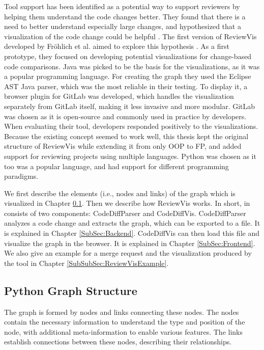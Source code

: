 \documentclass[a4paper,11pt,twoside]{article}
\theoremstyle{definition} %
\renewcommand{\cite}[1]{\citep{#1}}
\begin{document}
Tool support has been identified as a potential way to support reviewers by helping them understand the code changes better. They found that there is a need to better understand especially large changes, and hypothesized that a visualization of the code change could be helpful \cite{baum2016need}. The first version of ReviewVis developed by Fröhlich et al. aimed to explore this hypothesis \cite{publication-20661}. As a first prototype, they focused on developing potential visualizations for change-based code comparisons. Java was picked to be the basis for the visualizations, as it was a popular programming language. For creating the graph they used the Eclipse AST Java parser, which was the most reliable in their testing. To display it, a browser plugin for GitLab was developed, which handles the visualization separately from GitLab itself, making it less invasive and more modular. GitLab was chosen as it is open-source and commonly used in practice by developers. When evaluating their tool, developers responded positively to the visualizations. Because the existing concept seemed to work well, this thesis kept the original structure of ReviewVis while extending it from only OOP to FP, and added support for reviewing projects using multiple languages. Python was chosen as it too was a popular language, and had support for different programming paradigms.

We first describe the elements (i.e., nodes and links) of the graph which is visualized in Chapter \ref{SubSec:PyGraphStruc}. Then we describe how ReviewVis works. In short, in consists of two components: CodeDiffParser and CodeDiffVis. CodeDiffParser analyzes a code change and extracts the graph, which can be exported to a file. It is explained in Chapter \ref{SubSec:Backend}. CodeDiffVis can then load this file and visualize the graph in the browser. It is explained in Chapter \ref{SubSec:Frontend}. We also give an example for a merge request and the visualization produced by the tool in Chapter \ref{SubSubSec:ReviewVisExample}.


\subsection{Python Graph Structure} \label{SubSec:PyGraphStruc}
The graph is formed by nodes and links connecting these nodes. The nodes contain the necessary information to understand the type and position of the node, with additional meta-information to enable various features. The links establish connections between these nodes, describing their relationships. 
\end{document}
